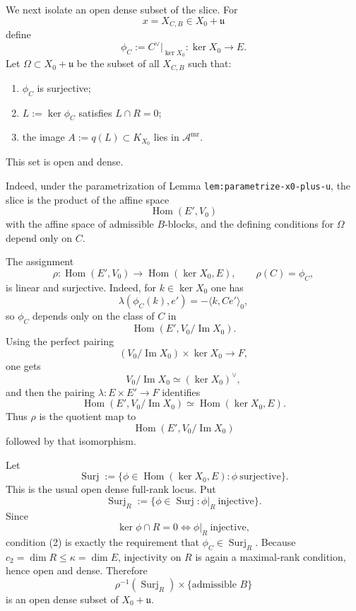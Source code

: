 \documentclass[
  11pt,
]{article}
\providecommand{\tightlist}{%
  \setlength{\itemsep}{0pt}\setlength{\parskip}{0pt}}
\begin{document}
We next isolate an open dense subset of the slice. For \[
x=X_{C,B}\in X_0+\mathfrak u
\] define \[
\phi_C:=C^\vee|_{\ker X_0}:\ker X_0\to E.
\] Let \(\Omega\subset X_0+\mathfrak u\) be the subset of all
\(X_{C,B}\) such that:

\begin{enumerate}
\def\labelenumi{\arabic{enumi}.}
\tightlist
\item
  \(\phi_C\) is surjective;
\item
  \(L:=\ker \phi_C\) satisfies \(L\cap R=0\);
\item
  the image \(A:=q(L)\subset K_{X_0}\) lies in
  \(\mathscr A^{\mathrm{mr}}\).
\end{enumerate}

This set is open and dense.

Indeed, under the parametrization of Lemma
\texttt{lem:parametrize-x0-plus-u}, the slice is the product of the
affine space \[
\operatorname{Hom}(E',V_0)
\] with the affine space of admissible \(B\)-blocks, and the defining
conditions for \(\Omega\) depend only on \(C\).

The assignment \[
\rho:\operatorname{Hom}(E',V_0)\longrightarrow \operatorname{Hom}(\ker X_0,E),
\qquad
\rho(C)=\phi_C,
\] is linear and surjective. Indeed, for \(k\in \ker X_0\) one has \[
\lambda(\phi_C(k),e')=-\langle k,Ce'\rangle_0,
\] so \(\phi_C\) depends only on the class of \(C\) in \[
\operatorname{Hom}(E',V_0/\operatorname{Im} X_0).
\] Using the perfect pairing \[
(V_0/\operatorname{Im} X_0)\times \ker X_0\to F,
\] one gets \[
V_0/\operatorname{Im} X_0\simeq (\ker X_0)^\vee,
\] and then the pairing \(\lambda:E\times E'\to F\) identifies \[
\operatorname{Hom}(E',V_0/\operatorname{Im} X_0)
\simeq
\operatorname{Hom}(\ker X_0,E).
\] Thus \(\rho\) is the quotient map to \[
\operatorname{Hom}(E',V_0/\operatorname{Im} X_0)
\] followed by that isomorphism.

Let \[
\operatorname{Surj}:=
\{\phi\in \operatorname{Hom}(\ker X_0,E):\phi\ \text{surjective}\}.
\] This is the usual open dense full-rank locus. Put \[
\operatorname{Surj}_R:=
\{\phi\in \operatorname{Surj}:\phi|_R\ \text{injective}\}.
\] Since \[
\ker \phi\cap R=0
\iff
\phi|_R\ \text{injective},
\] condition (2) is exactly the requirement that
\(\phi_C\in \operatorname{Surj}_R\). Because
\(c_2=\dim R\le \kappa=\dim E\), injectivity on \(R\) is again a
maximal-rank condition, hence open and dense. Therefore \[
\rho^{-1}(\operatorname{Surj}_R)\times
\{\text{admissible }B\}
\] is an open dense subset of \(X_0+\mathfrak u\).
\end{document}
